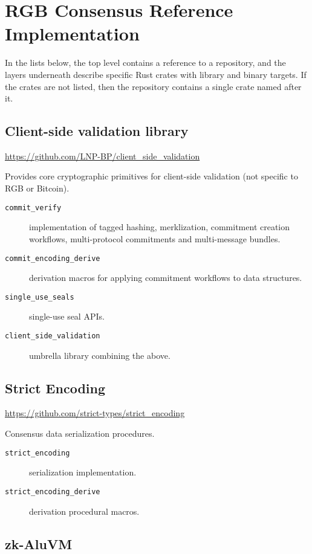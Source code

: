 \documentclass[9pt,oneside]{amsart}
\begin{document}
\newpage
\section{RGB Consensus Reference Implementation}\label{AnnexC}

In the lists below, the top level contains a reference to a repository,
and the layers underneath describe specific Rust crates with library and binary targets.
If the crates are not listed, then the repository contains a single crate named after it.

\subsection{Client-side validation library}

\url{https://github.com/LNP-BP/client_side_validation}

Provides core cryptographic primitives for client-side validation (not specific to RGB or Bitcoin).

\begin{description}
   \item[\texttt{commit\_verify}] implementation of tagged hashing, merklization,
   commitment creation workflows, multi-protocol commitments and multi-message bundles.
   \item[\texttt{commit\_encoding\_derive}]
   derivation macros for applying commitment workflows to data structures.
   \item[\texttt{single\_use\_seals}]
   single-use seal APIs.
   \item[\texttt{client\_side\_validation}]
   umbrella library combining the above.
\end{description}

\subsection{Strict Encoding}

\url{https://github.com/strict-types/strict_encoding}

Consensus data serialization procedures.

\begin{description}
    \item[\texttt{strict\_encoding}] serialization implementation.
    \item[\texttt{strict\_encoding\_derive}] derivation procedural macros.
\end{description}

\subsection{zk-AluVM}
\end{document}

